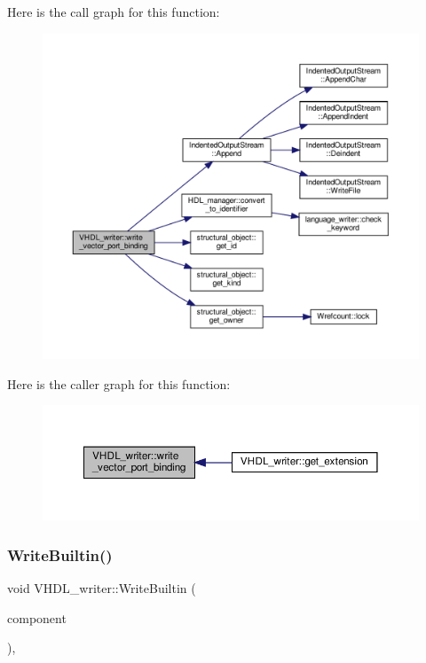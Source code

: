 Here is the call graph for this function\+:
\nopagebreak
\begin{figure}[H]
\begin{center}
\leavevmode
\includegraphics[width=350pt]{d0/d0c/structVHDL__writer_a8930dbb88b219d4ab659d65925541684_cgraph}
\end{center}
\end{figure}
Here is the caller graph for this function\+:
\nopagebreak
\begin{figure}[H]
\begin{center}
\leavevmode
\includegraphics[width=350pt]{d0/d0c/structVHDL__writer_a8930dbb88b219d4ab659d65925541684_icgraph}
\end{center}
\end{figure}
\mbox{\label{structVHDL__writer_a1058749b23119ee23449b16921619e04}} 
\subsubsection{\texorpdfstring{Write\+Builtin()}{WriteBuiltin()}}
{\footnotesize\ttfamily void V\+H\+D\+L\+\_\+writer\+::\+Write\+Builtin (\begin{DoxyParamCaption}\item[{const structural\+\_\+object\+Const\+Ref}]{component }\end{DoxyParamCaption})\hspace{0.3cm}{\ttfamily [override]}, {\ttfamily [virtual]}}



